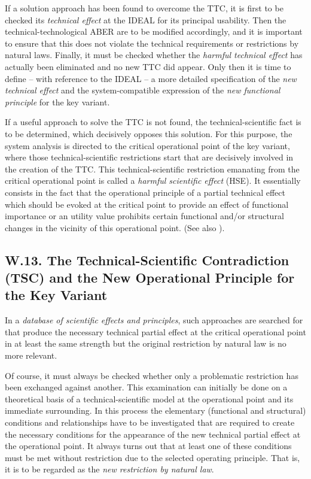 \documentclass[11pt,a4paper]{article}
\begin{document}
If a solution approach has been found to overcome the TTC, it is first to be
checked its \emph{technical effect} at the IDEAL for its principal usability.
Then the technical-technological ABER are to be modified accordingly, and it
is important to ensure that this does not violate the technical requirements
or restrictions by natural laws.  Finally, it must be checked whether the
\emph{harmful technical effect} has actually been eliminated and no new TTC
did appear.  Only then it is time to define -- with reference to the IDEAL --
a more detailed specification of the \emph{new technical effect} and the
system-compatible expression of the \emph{new functional principle} for the
key variant.

If a useful approach to solve the TTC is not found, the technical-scientific
fact is to be determined, which decisively opposes this solution.  For this
purpose, the system analysis is directed to the critical operational point of
the key variant, where those technical-scientific restrictions start that are
decisively involved in the creation of the TTC. This technical-scientific
restriction emanating from the critical operational point is called a
\emph{harmful scientific effect} (HSE). It essentially consists in the fact
that the operational principle of a partial technical effect which should be
evoked at the critical point to provide an effect of functional importance or
an utility value prohibits certain functional and/or structural changes in the
vicinity of this operational point. (See also \cite[A.7]{RM-21}).

\subsection*{W.13. The Technical-Scientific Contradiction (TSC) and the New
  Operational Principle for the Key Variant}

In a \emph{database of scientific effects and principles}, such approaches are
searched for that produce the necessary technical partial effect at the
critical operational point in at least the same strength but the original
restriction by natural law is no more relevant.

Of course, it must always be checked whether only a problematic restriction
has been exchanged against another. This examination can initially be done on
a theoretical basis of a technical-scientific model at the operational point
and its immediate surrounding.  In this process the elementary (functional and
structural) conditions and relationships have to be investigated that are
required to create the necessary conditions for the appearance of the new
technical partial effect at the operational point. It always turns out that at
least one of these conditions must be met without restriction due to the
selected operating principle. That is, it is to be regarded as the \emph{new
  restriction by natural law}.
\end{document}
